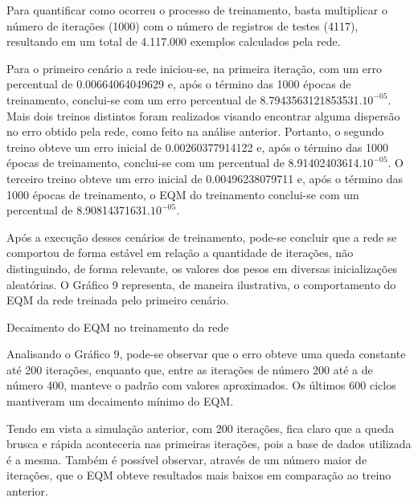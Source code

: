 Para quantificar como ocorreu o processo de treinamento, basta multiplicar o número de iterações (1000) com o número de registros de testes (4117), resultando em um total de 4.117.000 exemplos calculados pela rede.

Para o primeiro cenário a rede iniciou-se, na primeira iteração, com um erro percentual de 0.00664064049629 e, após o término das 1000 épocas de treinamento, conclui-se com um erro percentual de 8.7943563121853531.$10^{-05}$. Mais dois treinos distintos foram realizados visando encontrar alguma dispersão no erro obtido pela rede, como feito na análise anterior. Portanto, o segundo treino obteve um erro inicial de 0.00260377914122 e, após o término das 1000 épocas de treinamento, conclui-se com um percentual de 8.91402403614.$10^{-05}$. O terceiro treino obteve um erro inicial de 0.00496238079711 e, após o término das 1000 épocas de treinamento, o EQM do treinamento conclui-se com um percentual de 8.90814371631.$10^{-05}$.

Após a execução desses cenários de treinamento, pode-se concluir que a rede se comportou de forma estável em relação a quantidade de iterações, não distinguindo, de forma relevante, os valores dos pesos em diversas inicializações aleatórias. O Gráfico 9 representa, de maneira ilustrativa, o comportamento do EQM da rede treinada pelo primeiro cenário.
\begin{grafico}[h]
	\centering
	\caption{Decaimento do EQM no treinamento da rede}
	\label{lingua}
\end{grafico}

Analisando o Gráfico 9, pode-se observar que o erro obteve uma queda constante até 200 iterações, enquanto que, entre as iterações de número 200 até a de número 400, manteve o padrão com valores aproximados. Os últimos 600 ciclos mantiveram um decaimento mínimo do EQM.

Tendo em vista a simulação anterior, com 200 iterações, fica claro que a queda brusca e rápida aconteceria nas primeiras iterações, pois a base de dados utilizada é a mesma. Também é possível observar, através de um número maior de iterações, que o EQM obteve resultados mais baixos em comparação ao treino anterior.

